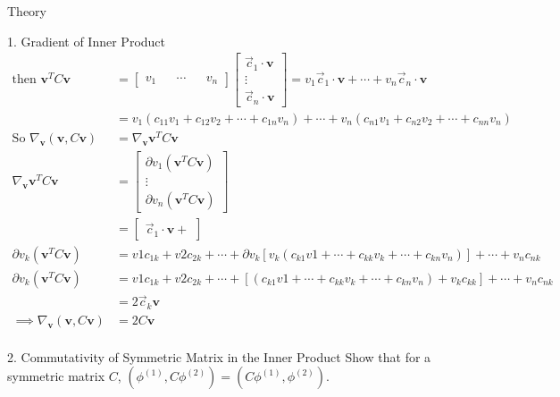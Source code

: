 \begin{section}{Theory}
\begin{homeworkSection}{1. Gradient of Inner Product}
{\begin{align*}
		\text{then } \bm{v}^T C\bm{v} &= \begin{bmatrix} v_1 &&  \cdots && v_n \end{bmatrix}
				\begin{bmatrix} \vec{c}_1 \cdot \bm{v} \\ \vdots \\ \vec{c}_n \cdot \bm{v} \end{bmatrix}
			= v_1 \vec{c}_1 \cdot \bm{v} + \cdots + v_ n \vec{c}_n \cdot \bm{v} \\
		&= v_1 (c_{11} v_1 + c_{12} v_2 + \cdots + c_{1n}v_n)  + \cdots + v_n (c_{n1} v_1 + c_{n2} v_2 + \cdots + c_{nn}v_n) \\ 
		\text{So } \nabla_{\bm{v}} (\bm{v}, C\bm{v}) &= \nabla_{\bm{v}} \bm{v}^T C\bm{v} \\
		\nabla_{\bm{v}} \bm{v}^T C\bm{v} &= 
			\begin{bmatrix} \partial v_1 (\bm{v}^T C\bm{v}) \\ \vdots \\ \partial v_n (\bm{v}^T C\bm{v}) \end{bmatrix} \\
		&= \begin{bmatrix} \vec{c}_1 \cdot \bm{v} + \end{bmatrix} \\
		\partial v_k (\bm{v}^T C\bm{v}) &= v1 c_{1k} + v2 c_{2k} + \cdots + \partial v_k \left [ v_k (c_{k1}v1 + \cdots + c_{kk}v_k + \cdots + c_{kn}v_n) \right ] + \cdots + v_n c_{nk}
		\\
		\partial v_k (\bm{v}^T C\bm{v}) &= v1 c_{1k} + v2 c_{2k} + \cdots + \left [ (c_{k1}v1 + \cdots + c_{kk}v_k + \cdots + c_{kn}v_n ) + v_k c_{kk} \right ] + \cdots + v_n c_{nk} \\
		&= 2 \vec{c}_k \bm{v} \\
		\implies \nabla_{\bm{v}} (\bm{v}, C\bm{v}) &= 2 C \bm{v} \\
	\end{align*}
}

\end{homeworkSection}

\begin{homeworkSection}{2. Commutativity of Symmetric Matrix in the Inner Product}
Show that for a symmetric matrix $C$, $( \phi^{(1)}, C\phi^{(2)} ) = ( C\phi^{(1)}, \phi^{(2)} )$.
\\
\\


\end{homeworkSection}
\end{section}
